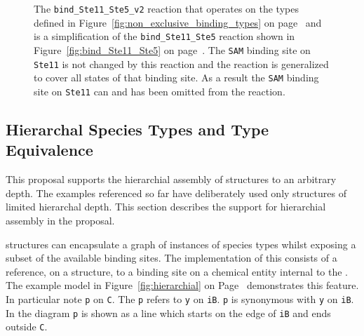 \documentclass{cekarticle}
\begin{document}
\begin{figure}[h]
  \caption{
  The \texttt{bind\_Ste11\_Ste5\_v2} reaction that operates on the types defined in
  Figure~\ref{fig:non_exclusive_binding_types} on page~\pageref{fig:non_exclusive_binding_types}
  and is a simplification of the \texttt{bind\_Ste11\_Ste5}
  reaction shown in Figure~\ref{fig:bind_Ste11_Ste5} on page~\pageref{fig:bind_Ste11_Ste5}.
  The \texttt{SAM} binding site on \texttt{Ste11} is not changed by
  this reaction and the reaction is generalized to cover all states of that binding site.  As a result
  the \texttt{SAM} binding site on \texttt{Ste11} can and has been omitted from the reaction.}

  \label{fig:bind_Ste11_Ste5_v2}
\end{figure}

\clearpage
\subsection{Hierarchal Species Types and Type Equivalence}

This proposal supports the hierarchial assembly of
 structures to an arbitrary depth. The examples
referenced so far have deliberately used only structures of
limited hierarchal depth.  This section describes the support for
hierarchial assembly in the proposal.

 structures can encapsulate a graph of
instances of species types whilst exposing a subset of the
available binding sites.  The implementation of this consists of a
reference, on a  structure, to a binding site
on a chemical entity internal to the .  The
example model in Figure~\ref{fig:hierarchial} on
Page~\pageref{fig:hierarchial} demonstrates this feature.  In
particular note  \texttt{p} on
 \texttt{C}.  The \texttt{p} refers to
 \texttt{y} on 
\texttt{iB}.  \texttt{p} is synonymous with \texttt{y} on
\texttt{iB}.  In the diagram \texttt{p} is shown as a line which
starts on the edge of \texttt{iB} and ends outside \texttt{C}.
\end{document}
